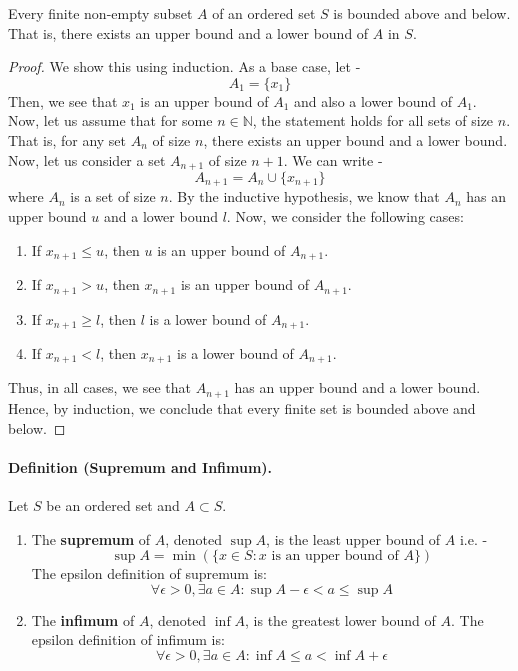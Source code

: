 \documentclass[openany]{book}
\numberwithin{equation}{section}
\begin{document}
    Every finite non-empty subset $A$ of an ordered set $S$ is bounded above and below. That is, there exists an upper bound and a lower bound of $A$ in $S$.
\par
\begin{proof}
We show this using induction. As a base case, let - 
$$A_1 = \{x_1\}$$
Then, we see that $x_1$ is an upper bound of $A_1$ and also a lower bound of $A_1$. Now, let us assume that for some $n \in \mathbb{N}$, the statement holds for all sets of size $n$. That is, for any set $A_n$ of size $n$, there exists an upper bound and a lower bound. Now, let us consider a set $A_{n+1}$ of size $n+1$. We can write -
$$A_{n+1} = A_n \cup \{x_{n+1}\}$$
where $A_n$ is a set of size $n$. By the inductive hypothesis, we know that $A_n$ has an upper bound $u$ and a lower bound $l$. Now, we consider the following cases: 
\begin{enumerate}
    \item If $x_{n+1} \leq u$, then $u$ is an upper bound of $A_{n+1}$.
    \item If $x_{n+1} > u$, then $x_{n+1}$ is an upper bound of $A_{n+1}$.
    \item If $x_{n+1} \geq l$, then $l$ is a lower bound of $A_{n+1}$.
    \item If $x_{n+1} < l$, then $x_{n+1}$ is a lower bound of $A_{n+1}$.
\end{enumerate}
Thus, in all cases, we see that $A_{n+1}$ has an upper bound and a lower bound. Hence, by induction, we conclude that every finite set is bounded above and below. 
\end{proof}
\paragraph{Definition (Supremum and Infimum).}

    Let $S$ be an ordered set and $A \subset S$.
    \begin{enumerate}
        \item The \textbf{supremum} of $A$, denoted $\sup A$, is the least upper bound of $A$ i.e. - 
        $$\sup A = \min ( \{x \in S : x \text{ is an upper bound of } A \} )$$
        The epsilon definition of supremum is:
        $$\forall \epsilon > 0, \exists a \in A: \sup A - \epsilon < a \leq \sup A$$
        \item The \textbf{infimum} of $A$, denoted $\inf A$, is the greatest lower bound of $A$.
        The epsilon definition of infimum is:
        $$\forall \epsilon > 0, \exists a \in A: \inf A \leq a < \inf A + \epsilon$$
    \end{enumerate}
\par
\end{document}
